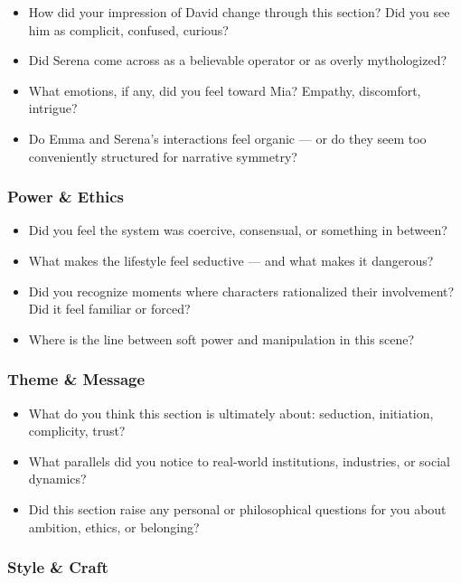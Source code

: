 \begin{itemize}
\item How did your impression of David change through this section? Did you see him as complicit, confused, curious?
\item Did Serena come across as a believable operator or as overly mythologized?
\item What emotions, if any, did you feel toward Mia? Empathy, discomfort, intrigue?
\item Do Emma and Serena’s interactions feel organic — or do they seem too conveniently structured for narrative symmetry?
\end{itemize}

\subsubsection{Power \& Ethics}

\begin{itemize}
\item Did you feel the system was coercive, consensual, or something in between?
\item What makes the lifestyle feel seductive — and what makes it dangerous?
\item Did you recognize moments where characters rationalized their involvement? Did it feel familiar or forced?
\item Where is the line between soft power and manipulation in this scene?
\end{itemize}

\subsubsection{Theme \& Message}

\begin{itemize}
\item What do you think this section is ultimately about: seduction, initiation, complicity, trust?
\item What parallels did you notice to real-world institutions, industries, or social dynamics?
\item Did this section raise any personal or philosophical questions for you about ambition, ethics, or belonging?
\end{itemize}

\subsubsection{Style \& Craft}

